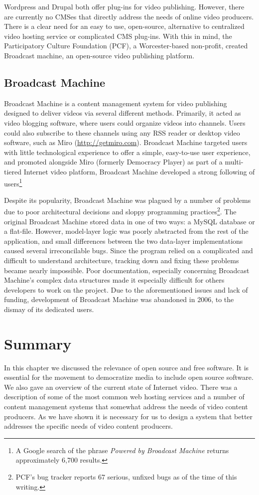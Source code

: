 \documentclass[a4paper,12pt]{report}
\begin{document}
Wordpress and Drupal both offer plug-ins for video publishing. However, there are currently no CMSes that directly address the needs of online video producers. There is a clear need for an easy to use, open-source, alternative to centralized video hosting service or complicated CMS plug-ins. With this in mind, the Participatory Culture Foundation (PCF), a Worcester-based non-profit, created Broadcast machine, an open-source video publishing platform.

\subsection {Broadcast Machine}
Broadcast Machine is a content management system for video publishing designed to deliver videos via several different methods. Primarily, 
it acted as video blogging software, where users could organize videos into channels. Users could also subscribe to these channels using any RSS reader or desktop video software, such as Miro (\url{http://getmiro.com}). Broadcast Machine targeted users with little technological experience to offer a simple, easy-to-use user experience, and promoted alongside Miro (formerly Democracy Player) as part of a multi-tiered Internet video platform, Broadcast Machine developed a strong following of users\footnote{A Google search of the phrase \textit{Powered by Broadcast Machine} returns approximately 6,700 results.}

Despite its popularity, Broadcast Machine was plagued by a number of problems due to poor architectural decisions and sloppy programming practices\footnote{PCF's bug tracker reports 67 serious, unfixed bugs as of the time of this writing.}. The original Broadcast Machine stored data in one of two ways: a MySQL database or a flat-file. However, model-layer logic was poorly abstracted from the rest of the application, and small differences between the two data-layer implementations caused several irreconcilable bugs. Since the program relied on a complicated and difficult to understand architecture, tracking down and fixing these problems became nearly impossible. Poor documentation, especially concerning Broadcast Machine's complex data structures made it especially difficult for others developers to work on the project. Due to the aforementioned issues and lack of funding, development of Broadcast Machine was abandoned in 2006, to the dismay of its dedicated users.

\section{Summary}
In this chapter we discussed the relevance of open source and free software. It is essential for the movement to democratize
media to include open source software. We also gave an overview of the current state of Internet video. There was a description of some
of the most common web hosting services and a number of content management systems that somewhat address the needs of video content
producers. As we have shown it is necessary for us to design a system that better addresses the specific needs of video content producers.
\end{document}
